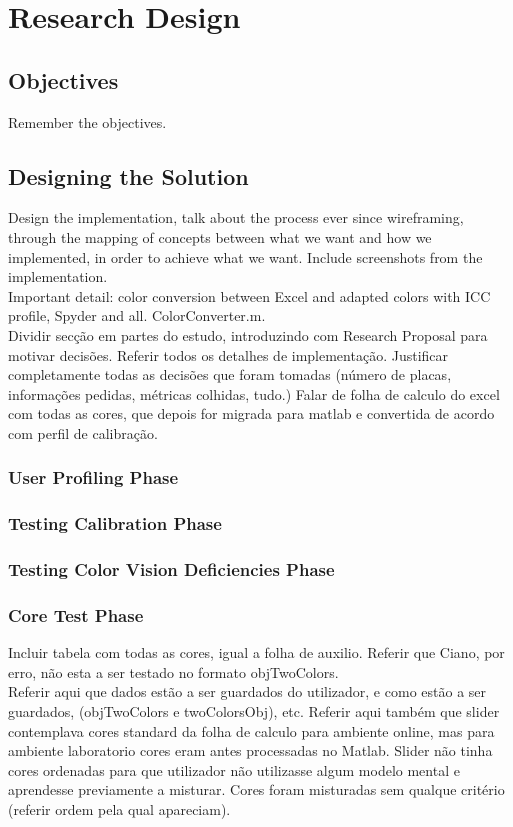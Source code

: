 
\chapter{Research Design}
\label{chapter:design}

\section{Objectives}
\label{sec:impl_objectives}
Remember the objectives. \\

\section{Designing the Solution}
\label{sec:impl_designingsolution}
Design the implementation, talk about the process ever since wireframing, through the mapping of concepts between
what we want and how we implemented, in order to achieve what we want. Include screenshots from the implementation. \\

Important detail: color conversion between Excel and adapted colors with ICC profile, Spyder and all. ColorConverter.m. \\
%
Dividir secção em partes do estudo, introduzindo com Research Proposal para motivar decisões. Referir todos os detalhes de implementação.
Justificar completamente todas as decisões que foram tomadas (número de placas, informações pedidas, métricas colhidas, tudo.)
%
Falar de folha de calculo do excel com todas as cores, que depois for migrada para matlab
e convertida de acordo com perfil de calibração.
%
\subsection{User Profiling Phase}
\label{subsec:design_profiling}
%
\subsection{Testing Calibration Phase}
\label{subsec:design_calibration}
%
\subsection{Testing Color Vision Deficiencies Phase}
\label{subsec:design_ishihara}
%
\subsection{Core Test Phase}
\label{subsec:design_core}
%
Incluir tabela com todas as cores, igual a folha de auxilio. Referir que Ciano, por erro, não esta a ser testado no formato objTwoColors. \\
Referir aqui que dados estão a ser guardados do utilizador, e como estão a ser guardados, (objTwoColors e twoColorsObj), etc.
Referir aqui também que slider contemplava cores standard da folha de calculo para ambiente online,
mas para ambiente laboratorio cores eram antes processadas no Matlab. Slider não tinha cores ordenadas para que utilizador não utilizasse
algum modelo mental e aprendesse previamente a misturar. Cores foram misturadas sem qualque critério (referir ordem pela qual apareciam).
%
